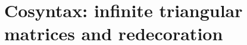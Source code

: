 \documentclass[
serif,
mathsans,
]
{beamer}
\newcommand{\fat}[1]{\textbf{#1}}
\begin{document}
\begin{comment}
\begin{frame}
 \frametitle{Binding signatures with (in)equations}
   \begin{block}{Equational theories}
    \begin{itemize}
     \item prime example: lambda calculus modulo $\beta$-equivalence
     \item Fiore with students Hur \& Mahmoud
     \item Hirschowitz \& Maggesi %
    \end{itemize}
   \end{block}
   
  \begin{block}{Reduction rules via \fat{in}equations}
   \begin{itemize}
    \item A., PhD thesis: 
     \begin{itemize}
      \item based on ideas by Hirschowitz \& Maggesi
      \item uses notion of \fat{relative} monad (Altenkirch et al. '10)
     \end{itemize}
   \end{itemize}
  \end{block}
  
  \begin{block}{Goal:}
   do the same for cosyntax, i.e.\ \fat{nested co}data types %
  \end{block}
\end{frame}
\end{comment}

\section{Cosyntax: infinite triangular matrices and redecoration}
\end{document}

